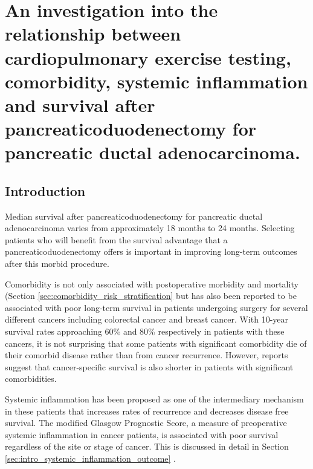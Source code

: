 
\chapter{An investigation into the relationship between cardiopulmonary exercise testing, comorbidity, systemic inflammation and survival after pancreaticoduodenectomy for pancreatic ductal adenocarcinoma.}
\label{ch_survival}


\clearpage

\section{Introduction}
Median survival after pancreaticoduodenectomy for pancreatic ductal adenocarcinoma varies from approximately 18 months to 24 months.\parencite{winter_1423_2006,neoptolemos_adjuvant_2010}  Selecting patients who will benefit from the survival advantage that a pancreaticoduodenectomy offers is important in improving long-term outcomes after this morbid procedure.

Comorbidity is not only associated with postoperative morbidity and mortality (Section \ref{sec:comorbidity_risk_stratification} but has also been reported to be associated with poor long-term survival in patients undergoing surgery for several different cancers including colorectal cancer \parencite{} and breast cancer.\parencite{} With 10-year survival rates approaching 60\% and 80\% respectively in patients with these cancers, it is not surprising that some patients with significant comorbidity die of their comorbid disease rather than from cancer recurrence. However, reports suggest that cancer-specific survival is also shorter in patients with significant comorbidities.

Systemic inflammation has been proposed as one of the intermediary mechanism in these patients that increases rates of recurrence and decreases disease free survival. The modified Glasgow Prognostic Score, a measure of preoperative systemic inflammation in cancer patients, is associated with poor survival regardless of the site or stage of cancer. This is discussed in detail in Section \ref{sec:intro_systemic_inflammation_outcome}
. 

